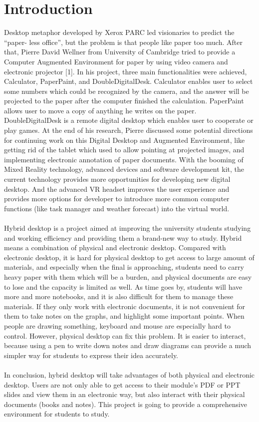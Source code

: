 
\chapter{Introduction} %

\label{Chapter1} %
Desktop metaphor developed by Xerox PARC led visionaries to predict the “paper- less office”, but the problem is that people like paper too much. After that, Pierre David Wellner from University of Cambridge tried to provide a Computer Augmented Environment for paper by using video camera and electronic projector [1]. In his project, three main functionalities were achieved, Calculator, PaperPaint, and DoubleDigitalDesk. Calculator enables user to select some numbers which could be recognized by the camera, and the answer will be projected to the paper after the computer finished the calculation. PaperPaint allows user to move a copy of anything he writes on the paper. DoubleDigitalDesk is a remote digital desktop which enables user to cooperate or play games. At the end of his research, Pierre discussed some potential directions for continuing work on this Digital Desktop and Augmented Environment, like getting rid of the tablet which used to allow pointing at projected images, and implementing electronic annotation of paper documents. With the booming of Mixed Reality technology, advanced devices and software development kit, the current technology provides more opportunities for developing new digital desktop. And the advanced VR headset improves the user experience and provides more options for developer to introduce more common computer functions (like task manager and weather forecast) into the virtual world.
\\
\\
Hybrid desktop is a project aimed at improving the university students studying and working efficiency and providing them a brand-new way to study. Hybrid means a combination of physical and electronic desktop. Compared with electronic desktop, it is hard for physical desktop to get access to large amount of materials, and especially when the final is approaching, students need to carry heavy paper with them which will be a burden, and physical documents are easy to lose and the capacity is limited as well. As time goes by, students will have more and more notebooks, and it is also difficult for them to manage these materials. If they only work with electronic documents, it is not convenient for them to take notes on the graphs, and highlight some important points. When people are drawing something, keyboard and mouse are especially hard to control. However, physical desktop can fix this problem. It is easier to interact, because using a pen to write down notes and draw diagrams can provide a much simpler way for students to express their idea accurately.
\\
\\
In conclusion, hybrid desktop will take advantages of both physical and electronic desktop. Users are not only able to get access to their module’s PDF or PPT slides and view them in an electronic way, but also interact with their physical documents (books and notes). This project is going to provide a comprehensive environment for students to study.  
